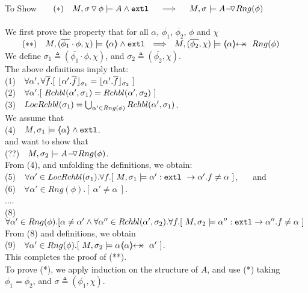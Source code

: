 $~$ \\
To Show \ \ \  $(*)\ \ \  M,  \PushSLong {\phi} {\sigma}   \models  A  \wedge \extThis    \ \  \ \  \Longrightarrow  \ \ \ \ M, \sigma \models \PushASLong  {Rng(\phi)} {A}$ 
\\ 
\SP \\
We first prove the property that for all $\alpha$,   $\overline {\phi_1}$, $\overline {\phi_2}$, $\phi$ and $\chi$\\
$\strut ~ \ \ \ \ \ (**)\ \ \    M, (\overline {\phi_1}\cdot\phi,\chi) \models \inside \alpha   \wedge \extThis \ \ \Longrightarrow \ \ M, (\overline {\phi_2},\chi) \models \protectedFrom \alpha {Rng(\phi)} $
\\
We define $\sigma_1 \triangleq (\overline {\phi_1}\cdot \phi,\chi)$, and  $\sigma_2 \triangleq (\overline {\phi_2},\chi) $.\\
The above definitions imply that: \\
\SP (1)\ \ $\forall \alpha',\forall \overline f.[\  \interpret {\sigma_1} {\alpha'.\overline f} =  \interpret {\sigma_2} {\alpha'.\overline f}\ ]$\\
\SP (2)\ \ $\forall \alpha'.[\  \Relevant {\alpha'} {\sigma_1} = \Relevant {\alpha'} {\sigma_2}\ ]$\\
\SP (3)\ \ $\LRelevantO {\sigma_1} = \bigcup_{\alpha'\in Rng(\phi)} \Relevant {\alpha'} {\sigma_1}$.\\
We   assume that\\
\SP (4)\ \  $M, \sigma_1 \models \inside \alpha \wedge \extThis$.\\
and want to show that\\
\SP (??)\ \ $M, \sigma_2 \models \PushASLong  {Rng(\phi)} {A}$.\\
From (4), and unfolding the definitions, we obtain:\\
\SP (5)\ \  $\forall \alpha'\in \LRelevantO {\sigma_1}.\forall f.[ \   M, \sigma_1 \models \alpha':\prg{extl}\ \rightarrow \alpha'.f  \neq \alpha\ ]$, \ \ \ and\\
\SP (6)\ \ $\forall \alpha'\in Rng (\phi). [ \ \alpha'\neq \alpha \ ]$.\\
....\\
\SP (8)\ \  $\forall \alpha'\in Rng (\phi).[ \alpha\neq \alpha' \wedge \forall \alpha''\in \Relevant {\alpha'} {\sigma_2}.\forall f.[\ M, \sigma_2 \models \alpha'':\prg{extl} \rightarrow \alpha''.f \neq \alpha\ ]$
\\
From (8) and definitions, we obtain\\
\SP (9)\ \  $\forall \alpha'\in Rng (\phi).[\ M, \sigma_2 \models \alpha \protectedFrom \alpha {\alpha'}\ ]$.\\
This completes the proof of (**).
 $\strut ~ \ $\\
 To prove (*), we apply induction on the structure of $A$, and use (*) taking   $\overline {\phi_1} = \overline { \phi_2}$, and $\sigma \triangleq (\overline {\phi_1},\chi).$

